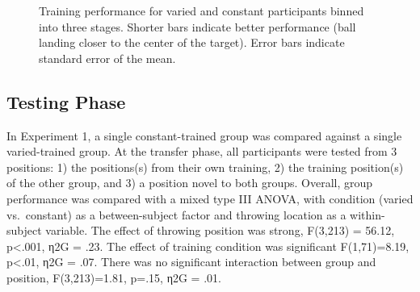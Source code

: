 \documentclass[
  12pt,
  letterpaper,
]{article}
\begin{document}
\begin{figure}


\caption{\label{fig-IGAS_Training1}Training performance for varied and
constant participants binned into three stages. Shorter bars indicate
better performance (ball landing closer to the center of the target).
Error bars indicate standard error of the mean.}

\end{figure}%

\subsection{Testing Phase}\label{testing-phase}

In Experiment 1, a single constant-trained group was compared against a
single varied-trained group. At the transfer phase, all participants
were tested from 3 positions: 1) the positions(s) from their own
training, 2) the training position(s) of the other group, and 3) a
position novel to both groups. Overall, group performance was compared
with a mixed type III ANOVA, with condition (varied vs.~constant) as a
between-subject factor and throwing location as a within-subject
variable. The effect of throwing position was strong, F(3,213) = 56.12,
p\textless.001, η2G = .23. The effect of training condition was
significant F(1,71)=8.19, p\textless.01, η2G = .07. There was no
significant interaction between group and position, F(3,213)=1.81,
p=.15, η2G = .01.
\end{document}
